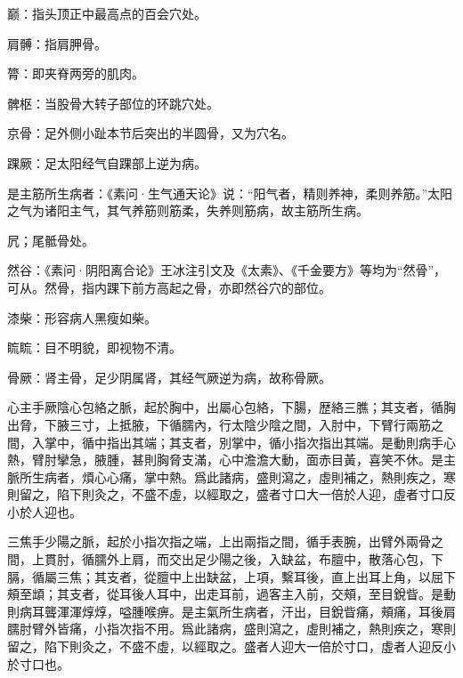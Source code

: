 \documentclass[12pt]{ctexbook}%
\begin{document}

\begin{jiaozhu}
  \item 巅：指头顶正中最高点的百会穴处。
  \item 肩髆：指肩胛骨。
  \item 膂：即夹脊两旁的肌肉。
  \item 髀枢：当股骨大转子部位的环跳穴处。
  \item 京骨：足外侧小趾本节后突出的半圆骨，又为穴名。
  \item 踝厥：足太阳经气自踝部上逆为病。
  \item 是主筋所生病者：《素问·生气通天论》说：“阳气者，精则养神，柔则养筋。”太阳之气为诸阳主气，其气养筋则筋柔，失养则筋病，故主筋所生病。
  \item 凥；尾骶骨处。
  \item 然谷：《素问·阴阳离合论》王冰注引文及《太素》、《千金要方》等均为“然骨”，可从。然骨，指内踝下前方高起之骨，亦即然谷穴的部位。
  \item 漆柴：形容病人黑瘦如柴。
  \item 䀮䀮：目不明貌，即视物不清。
  \item 骨厥：肾主骨，足少阴属肾，其经气厥逆为病，故称骨厥。
\end{jiaozhu}


\begin{yuanwen}
心主手厥陰心包絡之脈，起於胸中，出屬心包絡，下腸，歴絡三膲；其支者，循胸出脅，下腋三寸，上抵腋，下循臑內，行太陰少陰之間，入肘中，下臂行兩筋之間，入掌中，循中指出其端；其支者，別掌中，循小指次指出其端。是動則病手心熱，臂肘攣急，腋腫，甚則胸脅支滿，心中澹澹大動，面赤目黃，喜笑不休。是主脈所生病者，煩心心痛，掌中熱。爲此諸病，盛則瀉之，虛則補之，熱則疾之，寒則留之，陷下則灸之，不盛不虛，以經取之，盛者寸口大一倍於人迎，虛者寸口反小於人迎也。

三焦手少陽之脈，起於小指次指之端，上出兩指之間，循手表腕，出臂外兩骨之間，上貫肘，循臑外上肩，而交出足少陽之後，入缺盆，布膻中，散落心包，下膈，循屬三焦；其支者，從膻中上出缺盆，上項，繫耳後，直上出耳上角，以屈下頰至䪼；其支者，從耳後人耳中，出走耳前，過客主入前，交頰，至目銳眥。是動則病耳聾渾渾焞焞，嗌腫喉痹。是主氣所生病者，汗出，目銳眥痛，頰痛，耳後肩臑肘臂外皆痛，小指次指不用。爲此諸病，盛則瀉之，虛則補之，熱則疾之，寒則留之，陷下則灸之，不盛不虛，以經取之。盛者人迎大一倍於寸口，虛者人迎反小於寸口也。
\end{yuanwen}
\end{document}
